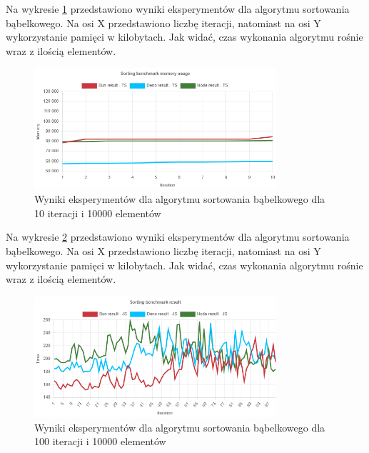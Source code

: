 Na wykresie \ref{fig:bubble_sorting_e4_memory_ts} przedstawiono wyniki eksperymentów dla algorytmu sortowania bąbelkowego. Na osi X przedstawiono liczbę iteracji, natomiast na osi Y wykorzystanie pamięci w kilobytach. Jak widać, czas wykonania algorytmu rośnie wraz z ilością elementów.
\begin{figure}[H]
  \centering
  \includegraphics[width=0.8\textwidth]{Figures/sorting/bubble/e4_memory_ts.png}
  \caption{Wyniki eksperymentów dla algorytmu sortowania bąbelkowego dla 10 iteracji i 10000 elementów}
  \label{fig:bubble_sorting_e4_memory_ts}
\end{figure}

Na wykresie \ref{fig:bubble_sorting_e5} przedstawiono wyniki eksperymentów dla algorytmu sortowania bąbelkowego. Na osi X przedstawiono liczbę iteracji, natomiast na osi Y wykorzystanie pamięci w kilobytach. Jak widać, czas wykonania algorytmu rośnie wraz z ilością elementów.
\begin{figure}[H]
  \centering
  \includegraphics[width=0.8\textwidth]{Figures/sorting/bubble/e5_js.png}
  \caption{Wyniki eksperymentów dla algorytmu sortowania bąbelkowego dla 100 iteracji i 10000 elementów}
  \label{fig:bubble_sorting_e5}
\end{figure}

